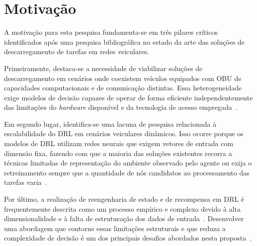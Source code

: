 


\section{Motivação}
\label{sec:motivacao}

A motivação para esta pesquisa fundamenta-se em três pilares críticos identificados após uma pesquisa bibliográfica no estado da arte das soluções de descarregamento de tarefas em redes veiculares.

Primeiramente, destaca-se a necessidade de viabilizar soluções de descarregamento em cenários onde coexistem veículos equipados com \gls{OBU} de capacidades computacionais e de comunicação distintas. Essa heterogeneidade exige modelos de decisão capazes de operar de forma eficiente independentemente das limitações do \textit{hardware} disponível e da tecnologia de acesso empregada~\cite{zheng2015, luo2024}.

Em segundo lugar, identifica-se uma lacuna de pesquisa relacionada à escalabilidade do \gls{DRL} em cenários veiculares dinâmicos. Isso ocorre porque os modelos de \gls{DRL} utilizam redes neurais que exigem vetores de entrada com dimensão fixa, fazendo com que a maioria das soluções existentes recorra a técnicas limitadas de representação do ambiente observado pelo agente ou exija o retreinamento sempre que a quantidade de nós candidatos ao processamento das tarefas varia~\cite{uddin2025,tang2024}. 

Por último, a realização de reengenharia de estado e de recompensa em \gls{DRL} é frequentemente descrita como um processo empírico e complexo devido à alta dimensionalidade e à falta de estruturação dos dados de entrada~\cite{shi2023}. 
Desenvolver uma abordagem que contorne essas limitações estruturais e que reduza a complexidade de decisão é um dos principais desafios abordados nesta proposta~\cite{ma2025}.


